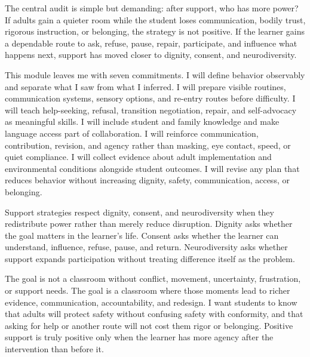 The central audit is simple but demanding: after support, who has more power? If adults gain a quieter room while the student loses communication, bodily trust, rigorous instruction, or belonging, the strategy is not positive. If the learner gains a dependable route to ask, refuse, pause, repair, participate, and influence what happens next, support has moved closer to dignity, consent, and neurodiversity.


This module leaves me with seven commitments. I will define behavior observably and separate what I saw from what I inferred. I will prepare visible routines, communication systems, sensory options, and re-entry routes before difficulty. I will teach help-seeking, refusal, transition negotiation, repair, and self-advocacy as meaningful skills. I will include student and family knowledge and make language access part of collaboration. I will reinforce communication, contribution, revision, and agency rather than masking, eye contact, speed, or quiet compliance. I will collect evidence about adult implementation and environmental conditions alongside student outcomes. I will revise any plan that reduces behavior without increasing dignity, safety, communication, access, or belonging.


Support strategies respect dignity, consent, and neurodiversity when they redistribute power rather than merely reduce disruption. Dignity asks whether the goal matters in the learner's life. Consent asks whether the learner can understand, influence, refuse, pause, and return. Neurodiversity asks whether support expands participation without treating difference itself as the problem.

The goal is not a classroom without conflict, movement, uncertainty, frustration, or support needs. The goal is a classroom where those moments lead to richer evidence, communication, accountability, and redesign. I want students to know that adults will protect safety without confusing safety with conformity, and that asking for help or another route will not cost them rigor or belonging. Positive support is truly positive only when the learner has more agency after the intervention than before it.
